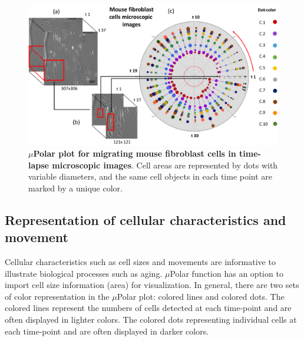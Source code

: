 \documentclass[conference]{IEEEtran}
\begin{document}
\begin{figure}
\centering
\includegraphics[width=\textwidth,height=10 cm]{Patterns/microscopic.pdf}
\caption{ \textbf{$\mu$Polar plot for migrating mouse fibroblast cells in time-lapse microscopic images}. Cell areas are represented by dots with variable diameters, and the same cell objects in each time point are marked by a unique color. 
}
\label{fig:scopic}
\end{figure}

\subsection{Representation of cellular characteristics and movement }
Cellular characteristics such as cell sizes and movements are informative to illustrate biological processes such as aging. $\mu$Polar function has an option to import cell size information (area) for  visualization. 
In general, there are two sets of color representation in the $\mu$Polar plot: colored lines and colored dots. The colored lines represent the numbers of cells detected at each time-point and are often displayed in lighter colors. The colored dots representing individual cells at each time-point and are often displayed in darker colors.
\end{document}
